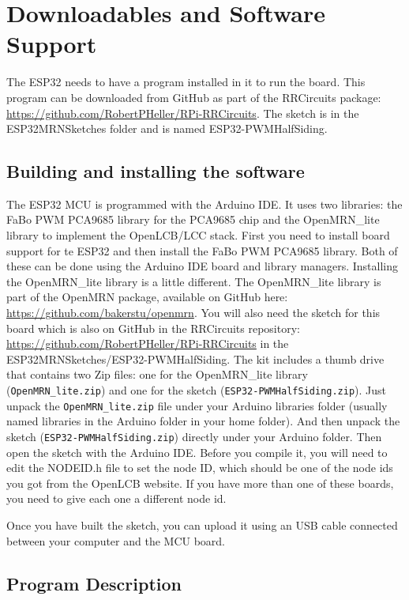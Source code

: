 \clearpage
\section{Downloadables and Software Support}

The ESP32 needs to have a program installed in it to run the board.  This 
program can be downloaded from GitHub as part of the RRCircuits package: 
\url{https://github.com/RobertPHeller/RPi-RRCircuits}. The sketch is in the 
ESP32MRNSketches folder and is named ESP32-PWMHalfSiding. 


\subsection{Building and installing the software}


The ESP32 MCU is programmed with the Arduino IDE. It uses two libraries: the
FaBo PWM PCA9685 library for the PCA9685 chip and the OpenMRN\_lite library to
implement the OpenLCB/LCC stack. First you need to install board support for
te ESP32 and then install the FaBo PWM PCA9685 library. Both of these can be
done using the Arduino IDE board and library managers. Installing the
OpenMRN\_lite library is a little different. The OpenMRN\_lite library is part
of the OpenMRN package, available on GitHub here:
\url{https://github.com/bakerstu/openmrn}. You will also need the sketch for
this board which is also on GitHub in the RRCircuits repository:
\url{https://github.com/RobertPHeller/RPi-RRCircuits} in the
ESP32MRNSketches/ESP32-PWMHalfSiding. The kit includes a thumb drive that
contains two Zip files: one for the OpenMRN\_lite library
(\texttt{OpenMRN\_lite.zip}) and one for the sketch
(\texttt{ESP32-PWMHalfSiding.zip}). Just unpack the \texttt{OpenMRN\_lite.zip}
file under your Arduino libraries folder (usually named libraries in the
Arduino folder in your home folder). And then unpack the sketch
(\texttt{ESP32-PWMHalfSiding.zip}) directly under your Arduino folder. Then
open the sketch with the Arduino IDE. Before you compile it, you will need to
edit the NODEID.h file to set the node ID, which should be one of the node ids
you got from the OpenLCB website. If you have more than one of these boards,
you need to give each one a different node id.

Once you have built the sketch, you can upload it using an USB cable connected 
between your computer and the MCU board.

\subsection{Program Description}

